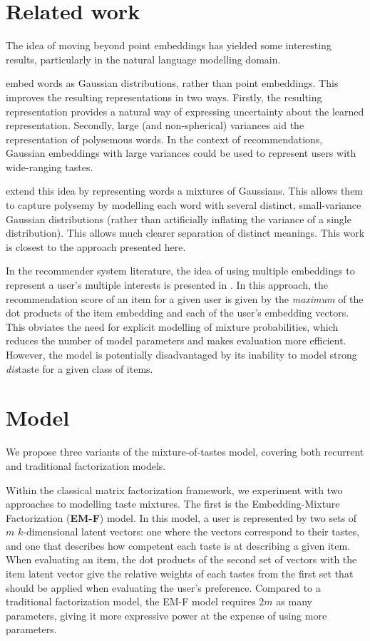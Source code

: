 \documentclass[sigconf]{acmart}
\begin{document}
\section{Related work}
The idea of moving beyond point embeddings has yielded some interesting results, particularly in the natural language modelling domain.

\citet{vilnis2014word} embed words as Gaussian distributions, rather than point embeddings. This improves the resulting representations in two ways. Firstly, the resulting representation provides a natural way of expressing uncertainty about the learned representation. Secondly, large (and non-spherical) variances aid the representation of polysemous words. In the context of recommendations, Gaussian embeddings with large variances could be used to represent users with wide-ranging tastes.

\citet{athiwaratkun2017multimodal} extend this idea by representing words a mixtures of Gaussians. This allows them to capture polysemy by modelling each word with several distinct, small-variance Gaussian distributions (rather than artificially inflating the variance of a single distribution). This allows much clearer separation of distinct meanings. This work is closest to the approach presented here.

In the recommender system literature, the idea of using multiple embeddings to represent a user's multiple interests is presented in \citet{weston2013nonlinear}. In this approach, the recommendation score of an item for a given user is given by the \emph{maximum} of the dot products of the item embedding and each of the user's embedding vectors. This obviates the need for explicit modelling of mixture probabilities, which reduces the number of model parameters and makes evaluation more efficient. However, the model is potentially disadvantaged by its inability to model strong \emph{dis}taste for a given class of items.

\section{Model}
We propose three variants of the mixture-of-tastes model, covering both recurrent and traditional factorization models.

Within the classical matrix factorization framework, we experiment with two approaches to modelling taste mixtures. The first is the Embedding-Mixture Factorization (\textbf{EM-F}) model. In this model, a user is represented by two sets of $m$ $k$-dimensional latent vectors: one where the vectors correspond to their tastes, and one that describes how competent each taste is at describing a given item. When evaluating an item, the dot products of the second set of vectors with the item latent vector give the relative weights of each tastes from the first set that should be applied when evaluating the user's preference. Compared to a traditional factorization model, the EM-F model requires $2m$ as many parameters, giving it more expressive power at the expense of using more parameters.
\end{document}
